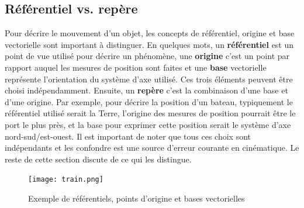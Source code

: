\subsection{Référentiel vs. repère}
Pour décrire le mouvement d'un objet, les concepts de référentiel, origine et base vectorielle sont important à distinguer. En quelques mots, un \textbf{référentiel} est un point de vue utilisé pour décrire un phénomène, une \textbf{origine} c'est un point par rapport auquel les mesures de position sont faites et une \textbf{base} vectorielle représente l'orientation du système d'axe utilisé. Ces trois éléments peuvent être choisi indépendamment.  Ensuite, un \textbf{repère} c'est la combinaison d'une base et d'une origine. Par exemple, pour décrire la position d'un bateau, typiquement le référentiel utilisé serait la Terre, l'origine des mesures de position pourrait être le port le plus près, et la base pour exprimer cette position serait le système d'axe nord-sud/est-ouest. Il est important de noter que tous ces choix sont indépendants et les confondre est une source d'erreur courante en cinématique. Le reste de cette section discute de ce qui les distingue.


\begin{figure}[H]
	\centering
		\texttt{[image: train.png]}
	\caption{Exemple de référentiels, points d'origine et bases vectorielles}
	\label{fig:train}
\end{figure}

